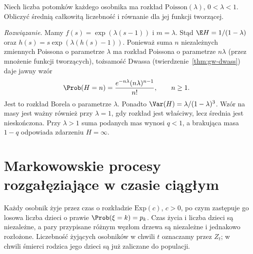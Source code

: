 \begin{zadanie}
Niech liczba potomków każdego osobnika ma rozkład
$\mathrm{Poisson}(\lambda)$, $0<\lambda<1$.
Obliczyć średnią całkowitą liczebność i równanie
dla jej funkcji tworzącej.

\emph{Rozwiązanie.} Mamy
$f(s)=\exp(\lambda(s-1))$ i $m=\lambda$.
Stąd $\E H=1/(1-\lambda)$ oraz
$h(s)=s\exp(\lambda(h(s)-1))$.
Ponieważ suma $n$ niezależnych zmiennych
Poissona o parametrze $\lambda$ ma rozkład
Poissona o parametrze $n\lambda$ (przez
mnożenie funkcji tworzących), tożsamość Dwassa
(twierdzenie~\ref{thm:gw-dwass}) daje jawny wzór
\[
\Prob(H=n)=\frac{e^{-n\lambda}(n\lambda)^{n-1}}{n!},
\qquad n\ge1.
\]
Jest to rozkład Borela o parametrze $\lambda$.
Ponadto $\Var(H)=\lambda/(1-\lambda)^3$.
Wzór na masy jest ważny również przy $\lambda=1$,
gdy rozkład jest właściwy, lecz średnia jest
nieskończona. Przy $\lambda>1$ suma podanych
mas wynosi $q<1$, a brakująca masa $1-q$
odpowiada zdarzeniu $H=\infty$.
\end{zadanie}

\section{Markowowskie procesy rozgałęziające w czasie ciągłym}

\begin{definicja}
Każdy osobnik żyje przez czas o rozkładzie
$\mathrm{Exp}(c)$, $c>0$, po czym zastępuje go
losowa liczba dzieci o prawie $\Prob(\xi=k)=p_k$.
Czas życia i liczba dzieci są niezależne, a pary
przypisane różnym węzłom drzewa są niezależne
i jednakowo rozłożone.
Liczebność żyjących osobników w chwili $t$
oznaczamy przez $Z_t$; w chwili śmierci rodzica
jego dzieci są już zaliczane do populacji.
\end{definicja}

